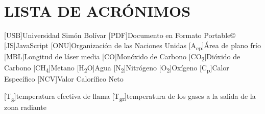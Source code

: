 \chapter*{LISTA DE ACRÓNIMOS}

\begin{acronym}

[USB]{Universidad Simón Bolívar}
[PDF]{Documento en Formato Portable\copyright}
[JS]{JavaScript}
[ONU]{Organización de las Naciones Unidas}
[A\textsubscript{cp}]{Área de plano frío}
[MBL]{Longitud de láser media}
[CO]{Monóxido de Carbono}
[CO\textsubscript{2}]{Dióxido de Carbono}
[CH\textsubscript{4}]{Metano}
[H\textsubscript{2}O]{Agua}
[N\textsubscript{2}]{Nitrógeno}
[O\textsubscript{2}]{Oxígeno}
[C\textsubscript{p}]{Calor Específico}
[NCV]{Valor Calorífico Neto}

[T\textsubscript{g}]{temperatura efectiva de llama}
[T\textsubscript{gr}]{temperatura de los gases a la salida de la zona radiante}


\end{acronym}
\clearpage